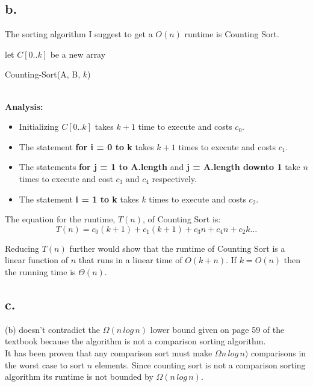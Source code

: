 \documentclass[12pt]{article}
\begin{document}
\subsection*{b.}
The sorting algorithm I suggest to get a $O(n)$ runtime is Counting Sort.
\begin{algorithm}
\BlankLine
let $C[0..k]$ be a new array\\
\For{$j=1$ to $A.length$}{
	$C[A[j]] = C[A[j]+1$\\
}
\caption{Counting-Sort(A, B, $k$)}
\end{algorithm}
\\
\textbf{Analysis: }
\begin{itemize}
\item Initializing $C[0..k]$ takes $k+1$ time to execute and costs $c_0$.
\item The statement \textbf{for i = 0 to k} takes $k+1$ times to execute and costs $c_1$.
\item The statements \textbf{for j = 1 to A.length} and \textbf{j = A.length downto 1} take $n$ times to execute and cost $c_3$ and $c_4$ respectively.
\item The statement \textbf{i = 1 to k} takes $k$ times to execute and costs $c_2$.
\end{itemize}
The equation for the runtime, $T(n)$, of Counting Sort is:\\
$$
T(n) = c_0(k+1) + c_1(k+1) + c_3n + c_4n + c_2k\ldots
$$

\noindent
Reducing $T(n)$ further would show that the runtime of Counting Sort is a linear function of $n$ that runs in a linear time of $O(k+n)$.
If $k=O(n)$ then the running time is $\Theta(n)$.

\subsection*{c.}
(b) doesn't contradict the $\Omega{(n\,log\,n)}$ lower bound given on page 59 of the textbook because the algorithm is not a comparison sorting algorithm.\\
It has been proven that any comparison sort must make $\Omega{n\,log\,n)}$ comparisons in the worst case to sort $n$ elements.  Since counting sort is not a comparison sorting algorithm its runtime is not bounded by $\Omega{(n\,log\,n)}$.
\end{document}
